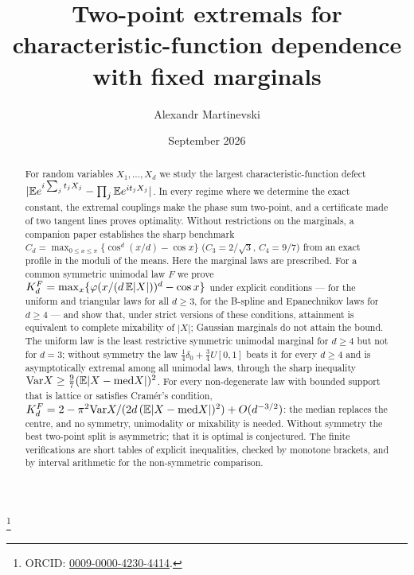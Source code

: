 \documentclass[11pt]{amsart}
\theoremstyle{definition}\newtheorem{definition}[theorem]{Definition}\theoremstyle{remark}\newtheorem{remark}[theorem]{Remark}
\begin{document}
\title[Two-point extremals with fixed marginals]{Two-point extremals for characteristic-function dependence\\ with fixed marginals}
\author{Alexandr Martinevski}
\address{Independent Researcher, Lithuania}
\thanks{ORCID: \href{https://orcid.org/0009-0000-4230-4414}{0009-0000-4230-4414}.}
\date{September 2026}
\begin{abstract}
For random variables $X_1,\dots,X_d$ we study the largest characteristic-function defect $|\mathbb E e^{i\sum_jt_jX_j}-\prod_j\mathbb E e^{it_jX_j}|$. In every regime where we determine the exact constant,
the extremal couplings make the phase sum two-point, and a certificate made of two tangent lines proves optimality. Without restrictions on the marginals, a companion paper establishes the sharp benchmark
$C_d=\max_{0\le x\le\pi}\{\cos^d(x/d)-\cos x\}$ ($C_3=2/\sqrt3$, $C_4=9/7$) from an exact profile in the moduli of the means. Here the marginal laws are prescribed. For
a common symmetric unimodal law $F$ we prove $K_d^F=\max_x\{\varphi(x/(d\,\mathbb E|X|))^d-\cos x\}$ under explicit conditions --- for the uniform and triangular laws for
all $d\ge3$, for the B-spline and Epanechnikov laws for $d\ge4$ --- and show that, under strict versions of these conditions, attainment is equivalent to complete mixability of $|X|$;
Gaussian marginals do not attain the bound. The uniform law is the least restrictive symmetric unimodal marginal for $d\ge4$ but not for $d=3$; without symmetry the law $\frac14\delta_0+\frac34U[0,1]$ beats it
for every $d\ge4$ and is asymptotically extremal among all unimodal laws, through the sharp inequality $\mathrm{Var}X\ge\frac97(\mathbb E|X-\mathrm{med}X|)^2$. For every non-degenerate
law with bounded support that is lattice or satisfies Cram\'er's condition, $K_d^F=2-\pi^2\mathrm{Var}X/(2d\,(\mathbb E|X-\mathrm{med}X|)^2)+O(d^{-3/2})$: the median replaces the centre, and no symmetry,
unimodality or mixability is needed. Without symmetry the best two-point split is asymmetric; that it is optimal is conjectured. The finite verifications are short tables of explicit inequalities, checked by monotone brackets, and by interval arithmetic for the non-symmetric comparison.
\end{abstract}
\maketitle
\end{document}

